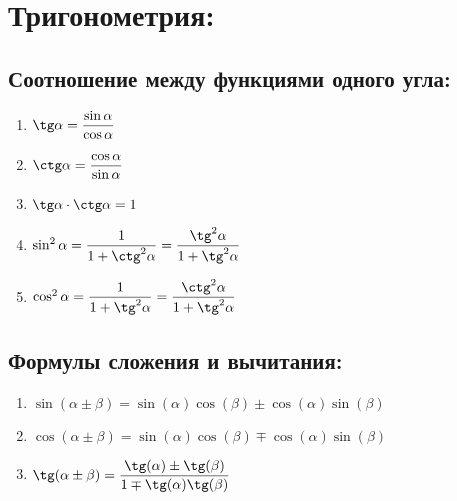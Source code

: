 \documentclass[12pt, a6paper]{extarticle}
\begin{document}
\section{Тригонометрия:}
\subsection{Соотношение между функциями одного угла:}
\begin{enumerate}
	\item $\tg \alpha =\displaystyle \frac{\sin \alpha}{\cos \alpha}	$
	\item $\ctg \alpha =\displaystyle \frac{\cos \alpha}{\sin \alpha}	$
	\item $\tg \alpha \cdot \ctg \alpha = 1$
	\item $\sin^2 \alpha = \displaystyle \frac{1}{1+\ctg^2 \alpha}=\frac{\tg^2 \alpha}{1+\tg^2 \alpha} $
	\item $\cos^2 \alpha = \displaystyle \frac{1}{1+\tg^2 \alpha}=\frac{\ctg^2 \alpha}{1+\tg^2 \alpha} $
\end{enumerate}
\subsection{Формулы сложения и вычитания:}
\begin{enumerate}
	\item $\sin(\alpha\pm\beta) = \sin(\alpha)\cos(\beta)\pm\cos(\alpha)\sin(\beta)$
	\item $\cos(\alpha\pm\beta) = \sin(\alpha)\cos(\beta)\mp\cos(\alpha)\sin(\beta)$
	\item $\tg(\alpha\pm\beta) = \displaystyle \frac{\tg(\alpha)\pm\tg(\beta)}{1\mp\tg(\alpha)\tg(\beta)}$
\end{enumerate}
\end{document}
